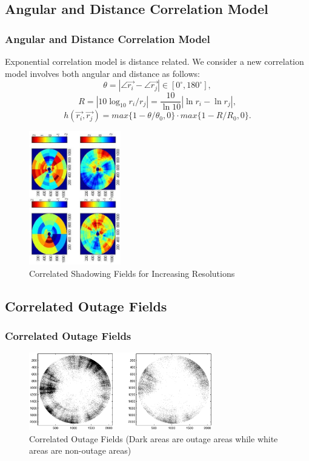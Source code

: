 \documentclass{beamer}
\begin{document}
\subsection{Angular and Distance Correlation Model}
\begin{frame}
\frametitle{Angular and Distance Correlation Model}
Exponential correlation model is distance related. We consider a new correlation model involves both angular and distance as follows:
\begin{equation}
\theta = |\angle\vec{r_{i}}-\angle\vec{r_{j}}|\in [0^{\circ},180^{\circ}],
\end{equation}
\begin{equation}
R=|10\log_{10}r_{i}/r_{j}|=\frac{10}{\ln 10}|\ln r_{i}-\ln r_{j}|,
\end{equation}
\begin{equation}
h(\vec{r_{i}},\vec{r_{j}})=max\{1-\theta/\theta_{0},0\}\cdot max\{1-R/R_{0},0\}.
\end{equation}
\begin{figure}
\includegraphics[width=4cm, angle=270]{shadowingfield_V3.eps}
\caption{Correlated Shadowing Fields for Increasing Resolutions}
\end{figure}
\end{frame}
\subsection{Correlated Outage Fields}
\begin{frame}
\frametitle{Correlated Outage Fields}
\begin{figure}
\centering
\includegraphics[width=8cm]{outagefield.eps}
\caption{Correlated Outage Fields (Dark areas are outage areas while white areas are non-outage areas)}
\label{outagefie}
\end{figure}
\end{frame}
%
\end{document}
